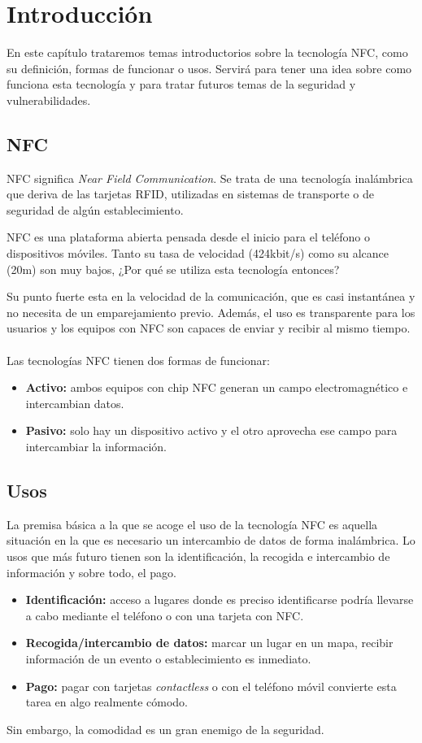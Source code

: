 \chapter{Introducción}\label{ch:introduction}
En este capítulo trataremos temas introductorios sobre la tecnología NFC, como su definición, formas de funcionar o usos. Servirá para tener una idea sobre como funciona esta tecnología y para tratar futuros temas de la seguridad y vulnerabilidades.
\clearpage
\section{NFC}
NFC significa \textit{Near Field Communication}. Se trata de una tecnología inalámbrica que deriva de las tarjetas RFID, utilizadas en sistemas de transporte o de seguridad de algún establecimiento.\par
NFC es una plataforma abierta pensada desde el inicio para el teléfono o dispositivos móviles. Tanto su tasa de velocidad (424kbit/s) como su alcance (20m) son muy bajos, ¿Por qué se utiliza esta tecnología entonces?\par
Su punto fuerte esta en la velocidad de la comunicación, que es casi instantánea y no necesita de un emparejamiento previo. Además, el uso es transparente para los usuarios y los equipos con NFC son capaces de enviar y recibir al mismo tiempo.\\\\
Las tecnologías NFC tienen dos formas de funcionar:
\begin{itemize}
	\item \textbf{Activo:} ambos equipos con chip NFC generan un campo electromagnético e intercambian datos.
	\item \textbf{Pasivo:} solo hay un dispositivo activo y el otro aprovecha ese campo para intercambiar la información.
\end{itemize}
\section{Usos}
La premisa básica a la que se acoge el uso de la tecnología NFC es aquella situación en la que es necesario un intercambio de datos de forma inalámbrica. Lo usos que más futuro tienen son la identificación, la recogida e intercambio de información y sobre todo, el pago.
\begin{itemize}
	\item \textbf{Identificación:} acceso a lugares donde es preciso identificarse podría llevarse a cabo mediante el teléfono o con una tarjeta con NFC.
	\item \textbf{Recogida/intercambio de datos:} marcar un lugar en un mapa, recibir información de un evento o establecimiento es inmediato.
	\item \textbf{Pago:} pagar con tarjetas \textit{contactless} o con el teléfono móvil convierte esta tarea en algo realmente cómodo.
\end{itemize}
Sin embargo, la comodidad es un gran enemigo de la seguridad.
